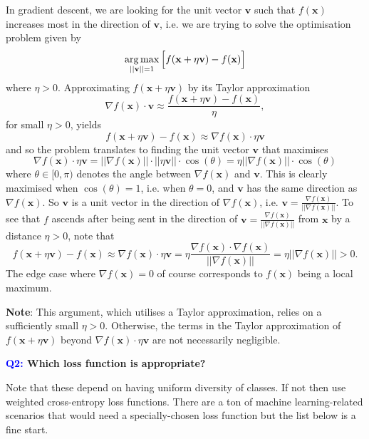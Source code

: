 \documentclass[11pt]{article}
\begin{document}
In gradient descent, we are looking for the unit vector $\mathbf{v}$ such that $f(\mathbf{x})$ increases most in the direction of $\mathbf{v}$, i.e. we are trying to solve the optimisation problem given by
$$\operatorname*{arg\,max}_{||\mathbf{v}||=1}\Big[f(\mathbf{x}+\eta\mathbf{v})-f(\mathbf{x})\Big]$$
where $\eta>0$. Approximating $f(\mathbf{x}+\eta\mathbf{v})$ by its Taylor approximation
$$
\nabla f(\mathbf{x})\cdot\mathbf{v}\approx\frac{f(\mathbf{x}+\eta\mathbf{v})-f(\mathbf{x})}{\eta},
$$
for small $\eta>0$, yields
$$
f(\mathbf{x}+\eta\mathbf{v})-f(\mathbf{x})
\approx
\nabla f(\mathbf{x})\cdot\eta\mathbf{v}
$$
and so the problem translates to finding the unit vector $\mathbf{v}$ that maximises
$$
\nabla f(\mathbf{x})\cdot\eta\mathbf{v}=||\nabla f(\mathbf{x})||\cdot||\eta\mathbf{v}||\cdot\cos(\theta)=\eta||\nabla f(\mathbf{x})||\cdot\cos(\theta)
$$
where $\theta\in[0,\pi)$ denotes the angle between $\nabla f(\mathbf{x})$ and $\mathbf{v}$. This is clearly maximised when $\cos(\theta)=1$, i.e. when $\theta=0$, and $\mathbf{v}$ has the same direction as $\nabla f(\mathbf{x})$. So $\mathbf{v}$ is a unit vector in the direction of $\nabla f(\mathbf{x})$, i.e. $\mathbf{v}=\frac{\nabla f(\mathbf{x})}{||\nabla f(\mathbf{x})||}$. To see that $f$ ascends after being sent in the direction of $\mathbf{v}=\frac{\nabla f(\mathbf{x})}{||\nabla f(\mathbf{x})||}$ from $\mathbf{x}$ by a distance $\eta>0$, note that
$$
f(\mathbf{x}+\eta\mathbf{v})-f(\mathbf{x})
\approx
\nabla f(\mathbf{x})\cdot\eta\mathbf{v}
=
\eta\frac{\nabla f(\mathbf{x})\cdot\nabla f(\mathbf{x})}{||\nabla f(\mathbf{x})||}
=
\eta||\nabla f(\mathbf{x})||
>
0.
$$
The edge case where $\nabla f(\mathbf{x})=0$ of course corresponds to $f(\mathbf{x})$ being a local maximum.

\vspace{10pt}

\noindent\textbf{Note}: This argument, which utilises a Taylor approximation, relies on a sufficiently small $\eta>0$. Otherwise, the terms in the Taylor approximation of $f(\mathbf{x}+\eta\mathbf{v})$ beyond $\nabla f(\mathbf{x})\cdot\eta\mathbf{v}$ are not necessarily negligible.

\begin{center}
    \textbf{\textcolor{blue}{Q2:} Which loss function is appropriate?}
\end{center}

\noindent Note that these depend on having uniform diversity of classes. If not then use weighted cross-entropy loss functions. There are a ton of machine learning-related scenarios that would need a specially-chosen loss function but the list below is a fine start.
\end{document}
